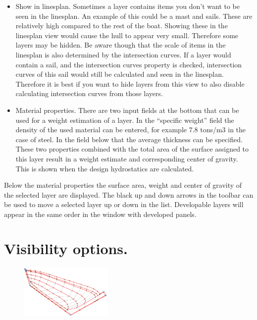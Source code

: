 \documentclass[12pt]{article}
\begin{document}
\begin{itemize}
\item Show in linesplan.
Sometimes a layer contains items you don't want to be seen in the
linesplan. An example of this could be a mast and sails. These are
relatively high compared to the rest of the boat.  Showing these in
the linesplan view would cause the hull to appear very
small. Therefore some layers may be hidden. Be aware though that the
scale of items in the linesplan is also determined by the intersection
curves. If a layer would contain a sail, and the intersection curves
property is checked, intersection curves of this sail would still be
calculated and seen in the linesplan. Therefore it is best if you want
to hide layers from this view to also disable calculating intersection
curves from those layers.

\item Material properties.
There are two input fields at the bottom that can be used for a weight
estimation of a layer. In the “specific weight” field the density of
the used material can be entered, for example 7.8 tons/m3 in the case
of steel. In the field below that the average thickness can be
specified. These two properties combined with the total area of the
surface assigned to this layer result in a weight estimate and
corresponding center of gravity. This is shown when the design
hydrostatics are calculated.

\end{itemize}

Below the material properties the surface area, weight and center of
gravity of the selected layer are displayed. The black up and down
arrows in the toolbar can be used to move a selected layer up or down
in the list. Developable layers will appear in the same order in the
window with developed panels.

\pagebreak

\section{Visibility options.} \label{visibility-options}

\begin{figure}
        \centering
        \includegraphics[width=0.4\textwidth,natwidth=529,natheight=308]{controlnet.png}
        \caption{}
        \label{fig:controlnet}
\end{figure}
\end{document}
